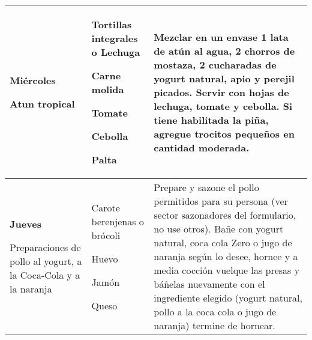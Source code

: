 \documentclass[menu.tex]{subfiles}
\begin{document}
\begin{tabular} {p{3cm} p{4.5cm} p{9cm}}
\pbox{20cm}
{
    \rule{0pt}{3ex}\begin{large}\textbf{Miércoles}\end{large}\\
    \rule{0pt}{2ex}Atun tropical
}&
\vspace{-0.8cm}
\begin{compactitem} 
    \begin{footnotesize}
        \item Tortillas integrales o Lechuga
        \item Carne molida
        \item Tomate
        \item Cebolla
        \item Palta
    \end{footnotesize}
\end{compactitem}&
\vspace{-0.8cm}
Mezclar en un envase 1 lata de atún al agua, 2 chorros de mostaza, 2 cucharadas de yogurt natural, apio y perejil picados. Servir con hojas de lechuga, tomate y cebolla. Si tiene habilitada la piña, agregue trocitos pequeños en cantidad moderada.\\
\hline

\pbox{20cm}
{
    \rule{0pt}{3ex}\begin{large}\textbf{Jueves}\end{large}\\
    \rule{0pt}{2ex}Preparaciones de pollo al yogurt, a la Coca-Cola y a la naranja
} & 
\vspace{-0.8cm}
\begin{compactitem} 
    \begin{footnotesize}
        \item Carote berenjenas o brócoli
        \item Huevo
        \item Jamón
        \item Queso
    \end{footnotesize}
\end{compactitem}&
\vspace{-0.8cm}
Prepare y sazone el pollo permitidos para su persona (ver sector sazonadores del formulario, no use otros). Bañe con yogurt natural, coca cola Zero o jugo de naranja según lo desee, hornee y a media cocción vuelque las presas y báñelas nuevamente con el ingrediente elegido (yogurt natural, pollo a la coca cola o jugo de naranja) termine de hornear.\\
\hline


\end{tabular}
\end{document}
